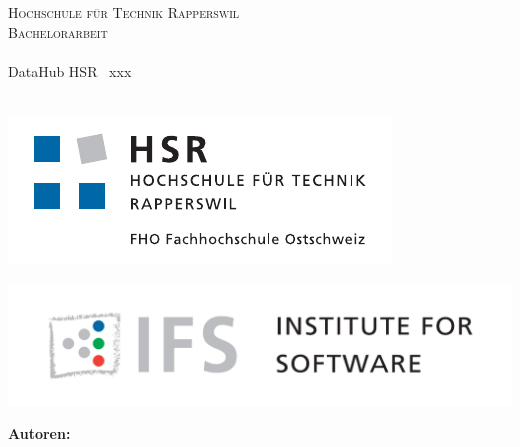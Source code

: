 
\author{
	\rlif \\
	\and
	\chuf \\
	\and
	\fscf \\
}

\clearpage
\begin{titlepage}
	
	\begin{center}
		\textsc{Hochschule für Technik Rapperswil} \\
		\textsc{Bachelorarbeit} \\ [25pt]
		\hr{0.5pt} \\[0.4cm]
		\huge DataHub HSR \textendash\ xxx \\
		\hr{2pt} \\[0.5cm]
		
		\begin{figure}[H]
			\centering
		\end{figure}
		
		\begin{minipage}{0.49\textwidth}
			\includegraphics[width=\textwidth]{fig/hsr-logo}
		\end{minipage}
		\begin{minipage}{0.49\textwidth}
			\includegraphics[width=\textwidth]{fig/ifs-logo}
		\end{minipage}
		
		\vfill
	\end{center}
	
		
	\begin{flushleft}
		\textbf{\LARGE Autoren:}\\
		\Large \rlif \\
		\Large \chuf \\
		\Large \fscf \\
		\vspace{1cm}
		

\end{flushleft}
\end{titlepage}
